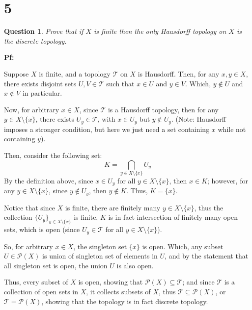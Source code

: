 \documentclass{article}
\newtheorem{question}{Question}
\begin{document}
\hfill

\section*{5}
\begin{question}
    Prove that if $X$ is finite then the only Hausdorff topology on $X$ is the discrete topology.
\end{question}

\textbf{Pf:}

Suppose $X$ is finite, and a topology $\mathcal{T}$ on $X$ is Hausdorff. Then, for any $x,y\in X$, there exists disjoint sets $U,V\in\mathcal{T}$
such that $x\in U$ and $y\in V$. Which, $y\notin U$ and $x\notin V$ in particular.

Now, for arbitrary $x\in X$, since $\mathcal{T}$ is a Hausdorff topology, then for any $y\in X\setminus\{x\}$, there exists $U_y\in \mathcal{T}$,
with $x\in U_y$ but $y\notin U_y$. (Note: Hausdorff imposes a stronger condition, but here we just need a set containing $x$ while not containing $y$).

\hfill

Then, consider the following set:
$$K=\bigcap_{y\in X\setminus\{x\}}U_y$$
By the definition above, since $x\in U_y$ for all $y\in X\setminus\{x\}$, then $x\in K$;
however, for any $y\in X\setminus\{x\}$, since $y\notin U_y$, then $y\notin K$. Thus, $K=\{x\}$.

Notice that since $X$ is finite, there are finitely many $y\in X\setminus\{x\}$, thus the collection $\{U_y\}_{y\in X\setminus\{x\}}$ is finite,
$K$ is in fact intersection of finitely many open sets, which is open (since $U_y\in \mathcal{T}$ for all $y\in X\setminus\{x\}$).

So, for arbitrary $x\in X$, the singleton set $\{x\}$ is open. Which, any subset $U\in \mathcal{P}(X)$ is union of singleton set of elements in $U$,
and by the statement that all singleton set is open, the union $U$ is also open.

\hfill

Thus, every subset of $X$ is open, showing that $\mathcal{P}(X)\subseteq \mathcal{T}$; and since $\mathcal{T}$ is a collection of open sets in $X$, 
it collects subsets of $X$, thus $\mathcal{T}\subseteq \mathcal{P}(X)$, or $\mathcal{T}=\mathcal{P}(X)$, showing that the topology is in fact discrete topology.
\end{document}
